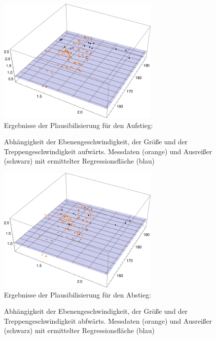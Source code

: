\begin{figure}[htpb]
\centering
\includegraphics[width=0.7\textwidth]{abbildungen/regression/2012_2017_verbund/ohneausreisser/auf-ebene-groesse.pdf}
\justify \ \\
Ergebnisse der Plausibilisierung für den Aufstieg:

\caption{Abhängigkeit der Ebenengeschwindigkeit, der Größe und der Treppengeschwindigkeit aufwärts. Messdaten (orange) und Ausreißer (schwarz) mit ermittelter Regressionsfläche (blau)}
\label{fig:2012_und_2017_OA_auf_ebene_groesse}
\end{figure}



\begin{figure}[htpb]
\centering
\includegraphics[width=0.7\textwidth]{abbildungen/regression/2012_2017_verbund/ohneausreisser/ab-ebene-groesse.pdf}
\justify \ \\
Ergebnisse der Plausibilisierung für den Abstieg:

\caption{Abhängigkeit der Ebenengeschwindigkeit, der Größe und der Treppengeschwindigkeit abfwärts. Messdaten (orange) und Ausreißer (schwarz) mit ermittelter Regressionsfläche (blau)}
\label{fig:2012_und_2017_OA_ab_ebene_groesse}
\end{figure}









